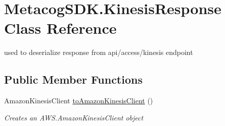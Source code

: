 \hypertarget{classMetacogSDK_1_1KinesisResponse}{}\section{Metacog\+S\+D\+K.\+Kinesis\+Response Class Reference}
\label{classMetacogSDK_1_1KinesisResponse}


used to deserialize response from api/access/kinesis endpoint  


\subsection*{Public Member Functions}
\begin{DoxyCompactItemize}
\item 
Amazon\+Kinesis\+Client \hyperlink{classMetacogSDK_1_1KinesisResponse_a7ad03fb69b82c2e149b433ce44c12120}{to\+Amazon\+Kinesis\+Client} ()
\begin{DoxyCompactList}\small\item\em Creates an A\+W\+S.\+Amazon\+Kinesis\+Client object \end{DoxyCompactList}\end{DoxyCompactItemize}

